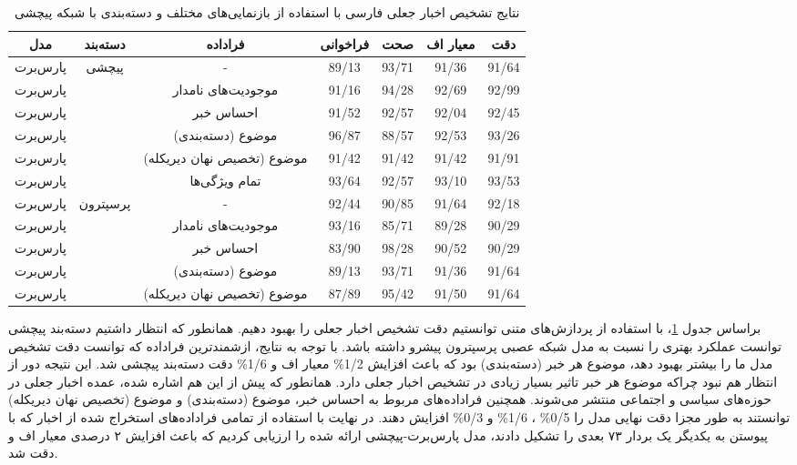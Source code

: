 \begin{table}
	\caption{نتایج تشخیص اخبار جعلی فارسی با استفاده از بازنمایی‌های مختلف و دسته‌بندی با شبکه پیچشی}
	\label{table.results_meta}
	\begin{center}
		\begin{tabular}{|c|c|c|c|c|c|c|}
			\hline
			مدل & دسته‌بند & فراداده & فراخوانی & صحت & معیار اف & دقت \\
			\hline
			\hline
			پارس‌برت & \multirow{5}{*}{پیچشی}
			& - & 89/13 & 93/71 & 91/36 & 91/64 \\
			\cline{0-0}\cline{3-7}
			پارس‌برت &  & موجودیت‌های نامدار & 91/16 & 94/28 & 92/69 & 92/99 \\
			\cline{0-0}\cline{3-7}
			پارس‌برت &  & احساس‌ خبر & 91/52 & 92/57 & 92/04 & 92/45 \\
			\cline{0-0}\cline{3-7}
			پارس‌برت &  & موضوع  (دسته‌بندی) & 96/87 & 88/57 & 92/53 & 93/26 \\
			\cline{0-0}\cline{3-7}
			پارس‌برت &  & موضوع  (تخصیص نهان دیریکله) & 91/42 & 91/42 & 91/42 & 91/91 \\
			\cline{0-0}\cline{3-7}
			پارس‌برت &  & تمام ویژگی‌ها & 93/64 & 92/57 & 93/10 & 93/53 \\
			\hline \hline
			پارس‌برت & \multirow{5}{*}{پرسپترون}
			& - & 92/44 & 90/85 & 91/64 & 92/18 \\
			\cline{0-0}\cline{3-7}
			پارس‌برت &  &موجودیت‌های نامدار & 93/16 & 85/71 & 89/28 & 90/29 \\
			\cline{0-0}\cline{3-7}
			پارس‌برت &  &احساس‌ خبر & 83/90 & 98/28 & 90/52 & 90/29 \\
			\cline{0-0}\cline{3-7}
			پارس‌برت &  & موضوع  (دسته‌بندی) & 89/13 & 93/71 & 91/36 & 91/64 \\
			\cline{0-0}\cline{3-7}
			پارس‌برت &  & موضوع  (تخصیص نهان دیریکله)  & 87/89 & 95/42 & 91/50 & 91/64 \\
			\hline
		\end{tabular}
	\end{center}
\end{table}
	براساس جدول \ref{table.results_meta}، با استفاده از پردازش‌های متنی توانستیم دقت تشخیص اخبار جعلی را بهبود دهیم. همانطور که انتظار داشتیم دسته‌بند پیچشی توانست عملکرد بهتری را نسبت به مدل شبکه عصبی پرسپترون پیشرو داشته باشد. با توجه به نتایج، ازشمندترین فراداده که توانست دقت تشخیص مدل ما را بیشتر بهبود دهد، موضوع هر خبر (دسته‌بندی) بود که باعث افزایش 1/2\% معیار اف و 1/6\% دقت دسته‌بند پیچشی شد. این نتیجه دور از انتظار هم نبود چراکه موضوع هر خبر تاثیر بسیار زیادی در تشخیص اخبار جعلی دارد. همانطور که پیش از این هم اشاره شده، عمده اخبار جعلی در حوزه‌های سیاسی و اجتماعی منتشر می‌شوند. همچنین فراداده‌های مربوط به احساس‌ خبر، موضوع (دسته‌بندی) و موضوع (تخصیص نهان دیریکله) توانستند به طور مجزا دقت نهایی مدل را 0/5\% ، 1/6\% و 0/3\% افزایش دهند. در نهایت با استفاده از تمامی فراداده‌های استخراج شده از اخبار که با پیوستن به یکدیگر یک بردار ۷۳ بعدی را تشکیل دادند، مدل‌ پارس‌برت-پیچشی ارائه شده را ارزیابی کردیم که باعث افزایش ۲ درصدی معیار اف و دقت شد.
	